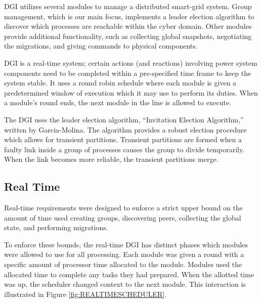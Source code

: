 DGI utilizes several modules to manage a distributed smart-grid system.
Group management, which is our main focus, implements a leader election algorithm to discover which processes are reachable within the cyber domain.
Other modules provide additional functionality, such as collecting global snapshots, negotiating the migrations, and giving commands to physical components.

DGI is a real-time system; certain actions (and reactions) involving power system components need to be completed within a pre-specified time frame to keep the system stable.
It uses a round robin schedule where each module is given a predetermined window of execution which it may use to perform its duties.
When a module's round ends, the next module in the line is allowed to execute. 

The DGI uses the leader election algorithm, ``Invitation Election Algorithm,'' written by Garcia-Molina\cite{INVITATIONELECTION}.
The algorithm provides a robust election procedure which allows for transient partitions.
Transient partitions are formed when a faulty link inside a group of processes causes the group to divide temporarily.
When the link becomes more reliable, the transient partitions merge.

\subsection{Real Time}
Real-time requirements were designed to enforce a strict upper bound on the amount of time used creating groups, discovering peers, collecting the global state, and performing migrations.

To enforce these bounds, the real-time DGI has distinct phases which modules were allowed to use for all processing.
Each module was given a round with a specific amount of processor time allocated to the module.
Modules used the allocated time to complete any tasks they had prepared.
When the allotted time was up, the scheduler changed context to the next module.
This interaction is illustrated in Figure \ref{fig:REALTIMESCHEDULER}.

